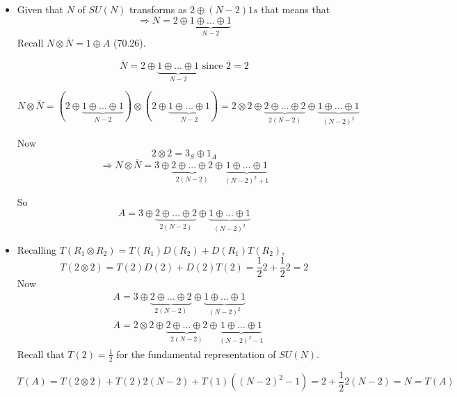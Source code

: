 \documentclass[twoside]{amsart}
\begin{document}
\begin{itemize}
$T^1 T^1 = -1 \left( \begin{matrix} & & \\ & & -1 \\ & 1 & \end{matrix} \right) \left( \begin{matrix} & & \\ & & -1 \\ & 1 & \end{matrix} \right) = -1 \left( \begin{matrix} & & \\ & -1 & \\ & & -1 \end{matrix} \right) = 2$
\item[(c)] Given that $N$ of $SU(N)$ transforms as $2 \oplus (N-2)1s$ that means that 
\[
\Longrightarrow \boxed{ N = 2 \oplus \underbrace{1 \oplus \dots \oplus 1 }_{N-2} }
\]
Recall $N \otimes \overline{N} = 1 \oplus A$ (70.26).  

\[
\overline{N}  = 2 \oplus \underbrace{1 \oplus \dots \oplus 1 }_{N-2} \text{ since } \overline{2} = 2
\]

\[
N \otimes \overline{N} = ( 2 \oplus  \underbrace{1 \oplus \dots \oplus 1 }_{N-2} ) \otimes ( 2 \oplus  \underbrace{1 \oplus \dots \oplus 1 }_{N-2} ) = 2 \otimes 2 \oplus \underbrace{ 2 \oplus \dots \oplus 2 }_{2(N-2)} \oplus \underbrace{ 1 \oplus \dots \oplus 1 }_{ (N-2)^2 }
\]

Now 
\[
2 \otimes 2 = 3_S \oplus 1_A
\]
\[
\Longrightarrow N \otimes \overline{N} = 3 \oplus \underbrace{ 2 \oplus \dots \oplus 2 }_{ 2 (N-2)} \oplus \underbrace{ 1 \oplus \dots \oplus 1 }_{ (N-2)^2 + 1 }
\]

So 
\[
\boxed{ A = 3 \oplus \underbrace{ 2 \oplus \dots \oplus 2}_{2 (N-2) } \oplus \underbrace{ 1 \oplus \dots \oplus 1}_{(N-2)^2 } }
\]

\item[(d)] Recalling $T(R_1 \otimes R_2) = T(R_1) D(R_2) + D(R_1) T(R_2)$,
\[
T(2 \otimes 2) = T(2) D(2) + D(2) T(2) = \frac{1}{2} 2 + \frac{1}{2} 2 =2 
\]
Now
\[
\begin{aligned}
  & A = 3 \oplus \underbrace{2 \oplus \dots \oplus 2}_{2 (N-2) } \oplus \underbrace{ 1 \oplus \dots \oplus 1 }_{(N-2)^2 } \\ 
  & A = 2 \otimes 2 \oplus \underbrace{ 2 \oplus  \dots \oplus 2}_{2 (N - 2) } \oplus \underbrace{ 1 \oplus \dots \oplus 1 }_{ (N-2)^2 -1 }
\end{aligned}
\]
Recall that $T(2) = \frac{1}{2}$ for the fundamental representation of $SU(N)$.  

\[
T(A) = T(2\otimes 2) + T(2)  2 (N-2) + T(1) ((N-2)^2 - 1) = 2 + \frac{1}{2} 2 (N-2) = \boxed{ N = T(A) }
\]

\end{itemize}
\end{document}
